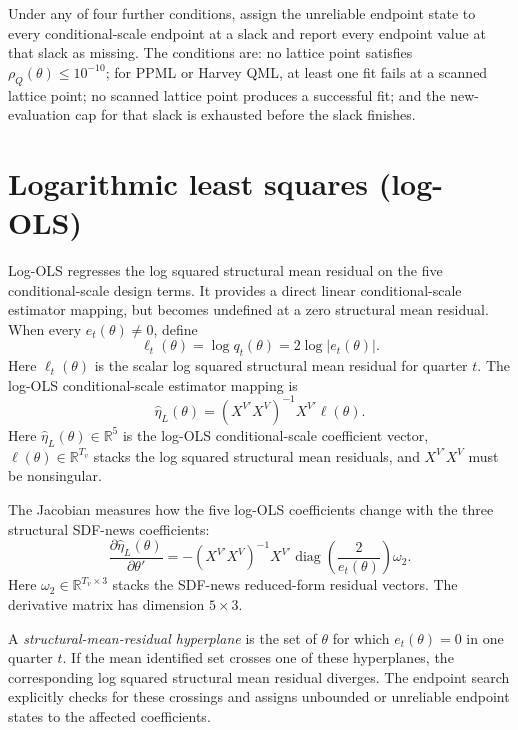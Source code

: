 \documentclass[11pt]{article}
\begin{document}
Under any of four further conditions, assign the unreliable endpoint state to every
conditional-scale endpoint at a slack and report every endpoint value at that slack as missing. The
conditions are: no lattice
point satisfies \(\rho_Q(\theta)\le10^{-10}\); for PPML or Harvey QML, at least one fit fails at a
scanned lattice point; no scanned lattice point produces a successful fit; and the new-evaluation
cap for that slack is exhausted before the slack finishes.

\section{Logarithmic least squares (log-OLS)}
\label{sec:logols}

Log-OLS regresses the log squared structural mean residual on the five conditional-scale design
terms. It provides a direct linear conditional-scale estimator mapping, but becomes undefined at a zero structural mean
residual. When every \(e_t(\theta)\ne0\), define
\begin{equation*}
 \ell_t(\theta)=\log q_t(\theta)=2\log|e_t(\theta)|.
\end{equation*}
Here \(\ell_t(\theta)\) is the scalar log squared structural mean residual for quarter \(t\). The
log-OLS conditional-scale estimator mapping is
\begin{equation*}
 \widehat\eta_L(\theta)=(X^{V\prime}X^V)^{-1}X^{V\prime}\ell(\theta).
\end{equation*}
Here \(\widehat\eta_L(\theta)\in\mathbb R^5\) is the log-OLS conditional-scale coefficient vector,
\(\ell(\theta)\in\mathbb R^{T_v}\) stacks the log squared structural mean residuals, and
\(X^{V\prime}X^V\) must be nonsingular.

The Jacobian measures how the five log-OLS coefficients change with the three structural SDF-news
coefficients:
\begin{equation*}
 \frac{\partial\widehat\eta_L(\theta)}{\partial\theta'}
 =-(X^{V\prime}X^V)^{-1}X^{V\prime}\operatorname{diag}
   \left(\frac{2}{e_t(\theta)}\right)\omega_2.
\end{equation*}
Here \(\omega_2\in\mathbb R^{T_v\times3}\) stacks the SDF-news reduced-form residual vectors. The
derivative matrix has dimension \(5\times3\).

A \emph{structural-mean-residual hyperplane} is the set of \(\theta\) for which \(e_t(\theta)=0\) in
one quarter \(t\). If the mean identified set crosses one of these hyperplanes, the corresponding log
squared structural mean residual diverges. The endpoint
search explicitly checks for these crossings and assigns unbounded or unreliable endpoint states to
the affected coefficients.
\end{document}
